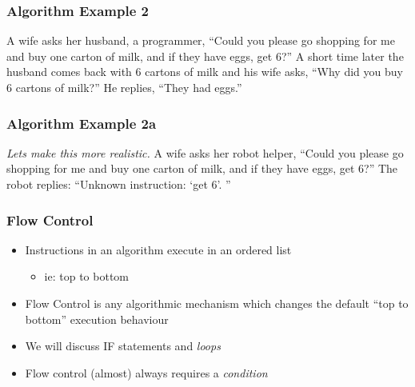 \documentclass[14pt]{beamer}
\begin{document}
\begin{frame}
\frametitle{Algorithm Example 2}
A wife asks her husband, a programmer, ``Could you please go shopping for me and buy one carton of milk, and if they have eggs, get 6?”
\linebreak \linebreak
A short time later the husband comes back with 6 cartons of milk and his wife asks, ``Why did you buy 6 cartons of milk?”
\linebreak \linebreak
He replies, “They had eggs.”
\end{frame}

\begin{frame}
\frametitle{Algorithm Example 2a}
\textit{Lets make this more realistic.}
\linebreak \linebreak
A wife asks her robot helper, ``Could you please go shopping for me and buy one carton of milk, and if they have eggs, get 6?”
\linebreak \linebreak
The robot replies: ``Unknown instruction: `get 6'. ''
\end{frame}

\begin{frame}
\frametitle{Flow Control}
\begin{itemize}
\item Instructions in an algorithm execute in an ordered list
	\begin{itemize}
		\item ie: top to bottom
	\end{itemize}
\item Flow Control is any algorithmic mechanism which changes the default ``top to bottom'' execution behaviour
\item We will discuss IF statements and \textit{loops}
\item Flow control (almost) always requires a \textit{condition}
\end{itemize}
\end{frame}
\end{document}
